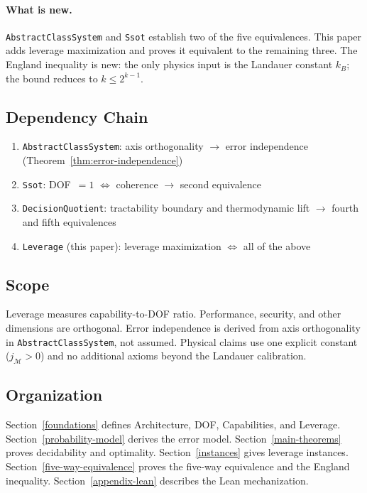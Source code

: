 \paragraph{What is new.} \texttt{AbstractClassSystem} and \texttt{Ssot} establish two of the five equivalences. This paper adds leverage maximization and proves it equivalent to the remaining three. The England inequality is new: the only physics input is the Landauer constant $k_B$; the bound reduces to $k \leq 2^{k-1}$.

\subsection{Dependency Chain}

\begin{enumerate}
\item \texttt{AbstractClassSystem}: axis orthogonality $\to$ error independence (Theorem~\ref{thm:error-independence})
\item \texttt{Ssot}: DOF~$= 1$ $\iff$ coherence $\to$ second equivalence
\item \texttt{DecisionQuotient}: tractability boundary and thermodynamic lift $\to$ fourth and fifth equivalences
\item \texttt{Leverage} (this paper): leverage maximization $\iff$ all of the above
\end{enumerate}

\subsection{Scope}

Leverage measures capability-to-DOF ratio. Performance, security, and other dimensions are orthogonal. Error independence is derived from axis orthogonality in \texttt{AbstractClassSystem}, not assumed. Physical claims use one explicit constant ($j_\mathcal{M} > 0$) and no additional axioms beyond the Landauer calibration.

\subsection{Organization}

Section~\ref{foundations} defines Architecture, DOF, Capabilities, and Leverage. Section~\ref{probability-model} derives the error model. Section~\ref{main-theorems} proves decidability and optimality. Section~\ref{instances} gives leverage instances. Section~\ref{five-way-equivalence} proves the five-way equivalence and the England inequality. Section~\ref{appendix-lean} describes the Lean mechanization.
